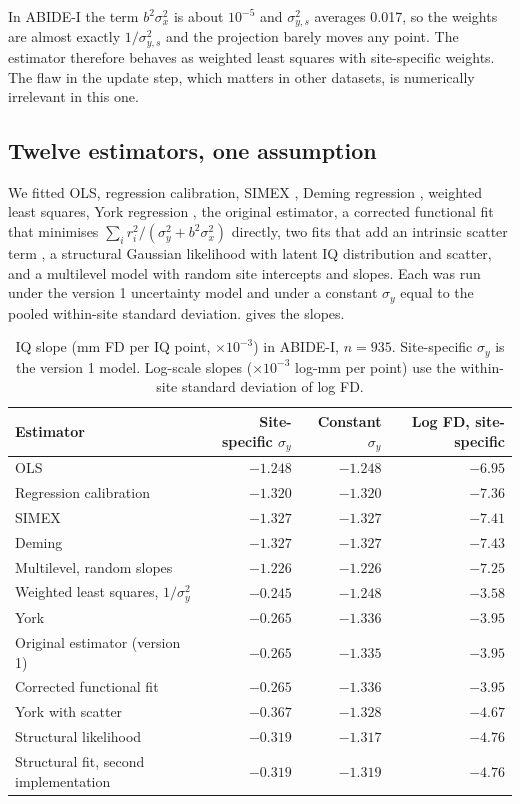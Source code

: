 \documentclass[11pt,a4paper]{article}
\newcommand{\sx}{\sigma_{x}}
\newcommand{\sy}{\sigma_{y}}
\begin{document}
In ABIDE-I the term $b^2\sx^2$ is about $10^{-5}$ and $\sigma_{y,s}^2$ averages 0.017, so the weights are almost exactly $1/\sigma_{y,s}^2$ and the projection barely moves any point. The estimator therefore behaves as weighted least squares with site-specific weights. The flaw in the update step, which matters in other datasets, is numerically irrelevant in this one.

\subsection{Twelve estimators, one assumption}

We fitted OLS, regression calibration, SIMEX \citep{CookStefanski1994}, Deming regression \citep{Deming1943}, weighted least squares, York regression \citep{York2004}, the original estimator, a corrected functional fit that minimises $\sum_i r_i^2 / (\sy^2 + b^2\sx^2)$ directly, two fits that add an intrinsic scatter term \citep{Tremaine2002, Kelly2007}, a structural Gaussian likelihood with latent IQ distribution and scatter, and a multilevel model with random site intercepts and slopes. Each was run under the version 1 uncertainty model and under a constant $\sy$ equal to the pooled within-site standard deviation.  gives the slopes.

\begin{table}[H]
\centering
\caption{IQ slope (mm FD per IQ point, $\times 10^{-3}$) in ABIDE-I, $n = 935$. Site-specific $\sy$ is the version 1 model. Log-scale slopes ($\times 10^{-3}$ log-mm per point) use the within-site standard deviation of log FD.}
\label{tab:panel}
\begin{tabular}{lrrr}
\toprule
Estimator & Site-specific $\sy$ & Constant $\sy$ & Log FD, site-specific \\
\midrule
OLS & $-1.248$ & $-1.248$ & $-6.95$ \\
Regression calibration & $-1.320$ & $-1.320$ & $-7.36$ \\
SIMEX & $-1.327$ & $-1.327$ & $-7.41$ \\
Deming & $-1.327$ & $-1.327$ & $-7.43$ \\
Multilevel, random slopes & $-1.226$ & $-1.226$ & $-7.25$ \\
\midrule
Weighted least squares, $1/\sy^2$ & $-0.245$ & $-1.248$ & $-3.58$ \\
York & $-0.265$ & $-1.336$ & $-3.95$ \\
Original estimator (version 1) & $-0.265$ & $-1.335$ & $-3.95$ \\
Corrected functional fit & $-0.265$ & $-1.336$ & $-3.95$ \\
\midrule
York with scatter & $-0.367$ & $-1.328$ & $-4.67$ \\
Structural likelihood & $-0.319$ & $-1.317$ & $-4.76$ \\
Structural fit, second implementation & $-0.319$ & $-1.319$ & $-4.76$ \\
\bottomrule
\end{tabular}
\end{table}
\end{document}
